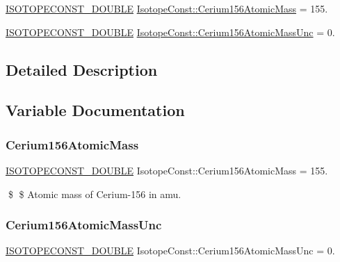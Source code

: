 \begin{DoxyCompactItemize}
\item 
\mbox{\hyperlink{group___isotope_const-_macros_ga8f45a7272ce02c0b4c65c44636ed719a}{I\+S\+O\+T\+O\+P\+E\+C\+O\+N\+S\+T\+\_\+\+D\+O\+U\+B\+LE}} \mbox{\hyperlink{group___isotope_const-_cerium-_ce156_ga98c8d2fdde687a931e77a6205307fca5}{Isotope\+Const\+::\+Cerium156\+Atomic\+Mass}} = 155.
\item 
\mbox{\hyperlink{group___isotope_const-_macros_ga8f45a7272ce02c0b4c65c44636ed719a}{I\+S\+O\+T\+O\+P\+E\+C\+O\+N\+S\+T\+\_\+\+D\+O\+U\+B\+LE}} \mbox{\hyperlink{group___isotope_const-_cerium-_ce156_ga32836e50e897329059729c2fc8bf6dde}{Isotope\+Const\+::\+Cerium156\+Atomic\+Mass\+Unc}} = 0.
\end{DoxyCompactItemize}


\subsection{Detailed Description}


\subsection{Variable Documentation}
\mbox{\label{group___isotope_const-_cerium-_ce156_ga98c8d2fdde687a931e77a6205307fca5}} 
\subsubsection{\texorpdfstring{Cerium156\+Atomic\+Mass}{Cerium156AtomicMass}}
{\footnotesize\ttfamily \mbox{\hyperlink{group___isotope_const-_macros_ga8f45a7272ce02c0b4c65c44636ed719a}{I\+S\+O\+T\+O\+P\+E\+C\+O\+N\+S\+T\+\_\+\+D\+O\+U\+B\+LE}} Isotope\+Const\+::\+Cerium156\+Atomic\+Mass = 155.}

\$ \$ Atomic mass of Cerium-\/156 in amu. \mbox{\label{group___isotope_const-_cerium-_ce156_ga32836e50e897329059729c2fc8bf6dde}} 
\subsubsection{\texorpdfstring{Cerium156\+Atomic\+Mass\+Unc}{Cerium156AtomicMassUnc}}
{\footnotesize\ttfamily \mbox{\hyperlink{group___isotope_const-_macros_ga8f45a7272ce02c0b4c65c44636ed719a}{I\+S\+O\+T\+O\+P\+E\+C\+O\+N\+S\+T\+\_\+\+D\+O\+U\+B\+LE}} Isotope\+Const\+::\+Cerium156\+Atomic\+Mass\+Unc = 0.}

